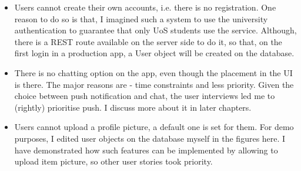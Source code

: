 \begin{itemize}
	\item Users cannot create their own accounts, i.e. there is no registration.  One reason to do so is that, I imagined such a system to use the university authentication to guarantee that only UoS students use the service. Although, there is a REST route available on the server side to do it, so that, on the first login in a production app, a User object will be created on the database.
	
	\item There is no chatting option on the app, even though the placement in the UI is there. The major reasons are - time constraints and less priority. Given the choice between push notification and chat, the user interviews led me to (rightly) prioritise push. I discuss more about it in later chapters.
	
	\item Users cannot upload a profile picture, a default one is set for them. For demo purposes, I edited user objects on the database myself in the figures here. I have demonstrated how such features can be implemented by allowing to upload item picture, so other user stories took priority.
\end{itemize}

